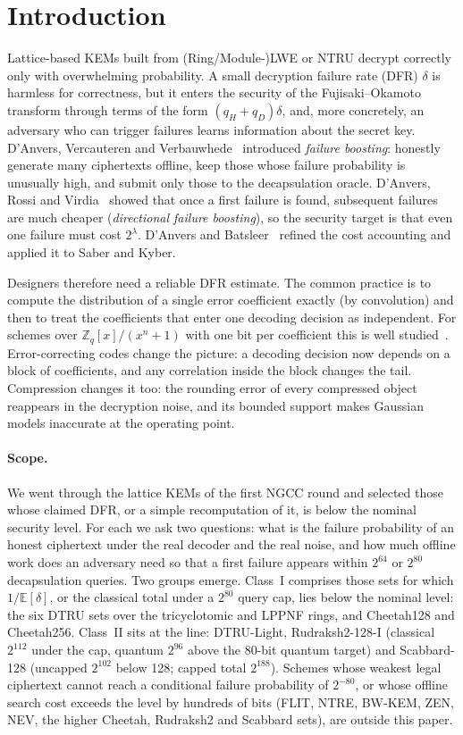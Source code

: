 \documentclass[11pt,a4paper]{article}
\theoremstyle{definition}
\theoremstyle{remark}
\newcommand{\E}{\mathbb{E}}
\newcommand{\Z}{\mathbb{Z}}
\newcommand{\dfr}{\delta}
\begin{document}
\section{Introduction}

Lattice-based KEMs built from (Ring/Module-)LWE or NTRU decrypt correctly
only with overwhelming probability. A small decryption failure rate (DFR)
$\dfr$ is harmless for correctness, but it enters the security of the
Fujisaki--Okamoto transform through terms of the form $(q_H+q_D)\dfr$, and,
more concretely, an adversary who can trigger failures learns information
about the secret key. D'Anvers, Vercauteren and Verbauwhede~\cite{DVV19}
introduced \emph{failure boosting}: honestly generate many ciphertexts
offline, keep those whose failure probability is unusually high, and submit
only those to the decapsulation oracle. D'Anvers, Rossi and
Virdia~\cite{DRV20} showed that once a first failure is found, subsequent
failures are much cheaper (\emph{directional failure boosting}), so the
security target is that even one failure must cost $2^\lambda$. D'Anvers and
Batsleer~\cite{DB22} refined the cost accounting and applied it to Saber and
Kyber.

Designers therefore need a reliable DFR estimate. The common practice is to
compute the distribution of a single error coefficient exactly (by
convolution) and then to treat the coefficients that enter one decoding
decision as independent. For schemes over $\Z_q[x]/(x^n+1)$ with one bit per
coefficient this is well studied~\cite{DVV19,DB22,FWZ22}. Error-correcting
codes change the picture: a decoding decision now depends on a block of
coefficients, and any correlation inside the block changes the tail.
Compression changes it too: the rounding error of every compressed object
reappears in the decryption noise, and its bounded support makes Gaussian
models inaccurate at the operating point.

\paragraph{Scope.}
We went through the lattice KEMs of the first NGCC round and selected those
whose claimed DFR, or a simple recomputation of it, is below the nominal
security level. For each we ask two questions: what is the failure
probability of an honest ciphertext under the real decoder and the real
noise, and how much offline work does an adversary need so that a first
failure appears within $2^{64}$ or $2^{80}$ decapsulation queries. Two
groups emerge. Class~I comprises those sets for which $1/\E[\dfr]$, or the
classical total under a $2^{80}$ query cap, lies below the nominal level:
the six DTRU sets over the tricyclotomic and LPPNF rings, and Cheetah128
and Cheetah256. Class~II sits at the line: DTRU-Light, Rudraksh2-128-I
(classical $2^{112}$ under the cap, quantum $2^{96}$ above the 80-bit
quantum target) and Scabbard-128 (uncapped $2^{102}$ below 128; capped
total $2^{188}$). Schemes whose weakest legal ciphertext
cannot reach a conditional failure probability of $2^{-80}$, or whose offline
search cost exceeds the level by hundreds of bits (FLIT, NTRE, BW-KEM, ZEN,
NEV, the higher Cheetah, Rudraksh2 and Scabbard sets), are outside this
paper.
\end{document}
